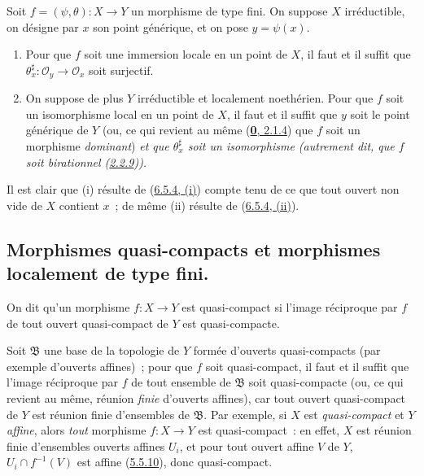 \begin{corollary}[6.5.5]
\label{I.6.5.5-fr}
Soit $f=(\psi,\theta):X\to Y$ un morphisme de type fini. On suppose $X$
irréductible, on désigne par $x$ son point générique, et on pose $y=\psi(x)$.
\begin{enumerate}
  \item[\textup{(i)}] Pour que $f$ soit une immersion locale en un point de $X$, il
    faut et il suffit que
    $\theta_x^\sharp:\mathscr{O}_y\to\mathscr{O}_x$ soit surjectif.
  \item[\textup{(ii)}] On suppose de plus $Y$ irréductible et localement noethérien.
    Pour que $f$ soit un isomorphisme local en un point de $X$, il faut et il
    suffit que $y$ soit le point générique de $Y$ \upshape(ou, ce qui revient au même
    (\hyperref[0.2.1.4-fr]{\textbf{0}, 2.1.4}) que $f$ soit un morphisme
    \emph{dominant}) \itshape et que $\theta_x^\sharp$ soit un isomorphisme \upshape(autrement
    dit, que $f$ soit \emph{birationnel}
    (\hyperref[I.2.2.9-fr]{2.2.9})).
\end{enumerate}
\end{corollary}

Il est clair que (i) résulte de
(\hyperref[I.6.5.4-fr]{6.5.4, (i)}) compte tenu de ce que tout ouvert non vide
de $X$ contient $x$~; de même (ii) résulte de
(\hyperref[I.6.5.4-fr]{6.5.4, (ii)}).

\subsection{Morphismes quasi-compacts et morphismes localement de type fini.}
\label{subsection:I.6.6-fr}

\begin{definition}[6.6.1]
\label{I.6.6.1-fr}
On dit qu'un morphisme $f:X\to Y$ est quasi-compact si l'image
réciproque par $f$ de tout ouvert quasi-compact de $Y$ est quasi-compacte.
\end{definition}

Soit $\mathfrak{B}$ une base de la topologie de $Y$ formée d'ouverts
quasi-compacts (par exemple d'ouverts affines)~; pour que $f$ soit
quasi-compact, il faut et il suffit que l'image réciproque par $f$ de tout
ensemble de $\mathfrak{B}$ soit quasi-compacte (ou, ce qui revient au même,
réunion \emph{finie} d'ouverts affines), car tout ouvert quasi-compact de $Y$
est réunion finie d'ensembles de $\mathfrak{B}$. Par exemple, si $X$ est
\emph{quasi-compact} et $Y$ \emph{affine}, alors \emph{tout} morphisme
$f:X\to Y$ est quasi-compact~: en effet, $X$ est réunion finie d'ensembles
ouverts affines $U_i$, et pour tout ouvert affine $V$ de $Y$,
$U_i\cap f^{-1}(V)$ est affine
(\hyperref[I.5.5.10-fr]{5.5.10}), donc quasi-compact.

